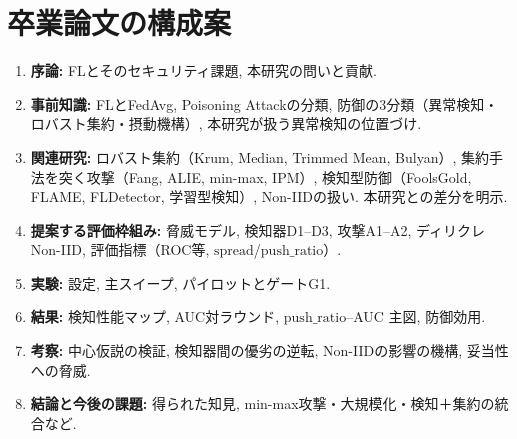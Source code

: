 \documentclass[a4j, twocolumn, dvipdfmx]{jsarticle}
\begin{document}
\section{卒業論文の構成案}

\begin{enumerate}
  \item \textbf{序論:} FLとそのセキュリティ課題, 本研究の問いと貢献.
  \item \textbf{事前知識:} FLとFedAvg, Poisoning Attackの分類, 防御の3分類（異常検知・ロバスト集約・摂動機構）, 本研究が扱う異常検知の位置づけ.
  \item \textbf{関連研究:} ロバスト集約（Krum, Median, Trimmed Mean, Bulyan）, 集約手法を突く攻撃（Fang, ALIE, min-max, IPM）, 検知型防御（FoolsGold, FLAME, FLDetector, 学習型検知）, Non-IIDの扱い. 本研究との差分を明示.
  \item \textbf{提案する評価枠組み:} 脅威モデル, 検知器D1--D3, 攻撃A1--A2, ディリクレNon-IID, 評価指標（ROC等, $\mathrm{spread}$/$\mathrm{push\_ratio}$）.
  \item \textbf{実験:} 設定, 主スイープ, パイロットとゲートG1.
  \item \textbf{結果:} 検知性能マップ, AUC対ラウンド, $\mathrm{push\_ratio}$--AUC 主図, 防御効用.
  \item \textbf{考察:} 中心仮説の検証, 検知器間の優劣の逆転, Non-IIDの影響の機構, 妥当性への脅威.
  \item \textbf{結論と今後の課題:} 得られた知見, min-max攻撃・大規模化・検知＋集約の統合など.
\end{enumerate}
\end{document}
